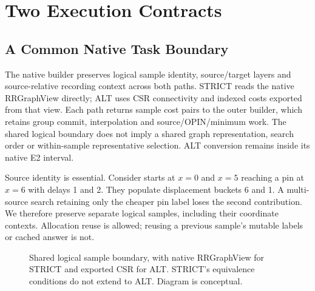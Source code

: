 \documentclass[conference,10pt,letterpaper]{IEEEtran}
\begin{document}
\section{Two Execution Contracts}
\subsection{A Common Native Task Boundary}
The native builder preserves logical sample identity, source/target layers and source-relative recording context across both paths. STRICT reads the native RRGraphView directly; ALT uses CSR connectivity and indexed costs exported from that view. Each path returns sample cost pairs to the outer builder, which retains group commit, interpolation and source/OPIN/minimum work. The shared logical boundary does not imply a shared graph representation, search order or within-sample representative selection. ALT conversion remains inside its native E2 interval.

Source identity is essential. Consider starts at $x=0$ and $x=5$ reaching a pin at $x=6$ with delays 1 and 2. They populate displacement buckets 6 and 1. A multi-source search retaining only the cheaper pin label loses the second contribution. We therefore preserve separate logical samples, including their coordinate contexts. Allocation reuse is allowed; reusing a previous sample's mutable labels or cached answer is not.

\begin{figure}[t]\centering
{}
\caption{Shared logical sample boundary, with native RRGraphView for STRICT and exported CSR for ALT. STRICT's equivalence conditions do not extend to ALT. Diagram is conceptual.}\label{fig:contracts}\end{figure}
\end{document}

